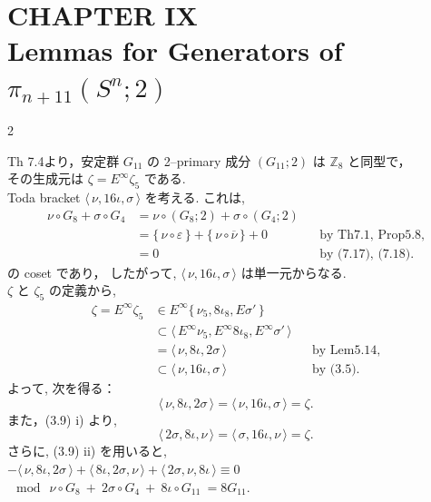 \documentclass[10pt, leqno]{ltjsarticle}
\author{}
\date{}
\newcommand{\toda}[1]{\{\,#1\,\}}              %
\newcommand{\todas}[1]{\langle\,#1\,\rangle}
\newcommand{\pis}[2]{\pi_{#1}(#2)}       %
\numberwithin{equation}{section}
\theoremstyle{plain}
\theoremstyle{definition}
\theoremstyle{remark}
\begin{document}
\setcounter{section}{9}


\section*{CHAPTER IX\\
Lemmas for Generators of \(\pis{n+11}{S^n;2}\)}

\begin{paracol}{2}

Th 7.4より，安定群 \(G_{11}\) の 2–primary 成分 \((G_{11};2)\) は 
\(\mathbb Z_8\) と同型で，\\
その生成元は \(\zeta=E^\infty\zeta_5\) である.\\
Toda bracket 
\(\todas{\nu,16\iota,\sigma}\)
を考える. これは,
\[
\begin{align*}
\nu\circ G_8+\sigma\circ G_4
& = \nu\circ (G_8;2)+\sigma\circ (G_4;2) \\
& = \{\,\nu\circ\varepsilon\,\}+\{\,\nu\circ\overline{\nu}\,\}+0 
&& \text{by Th7.1, Prop5.8,}\\
& = 0
&& \text{by (7.17), (7.18)}.
\end{align*}
\]
の coset であり，
したがって,  \(\todas{\nu,16\iota,\sigma}\) は単一元からなる. \\
\(\zeta\) と \(\zeta_5\) の定義から, 
\[
\begin{align*}
\zeta
= E^\infty\zeta_5
& \in E^\infty\toda{\nu_5,8\iota_8,E\sigma'}\\
& \subset \todas{E^\infty\nu_5, E^\infty8\iota_8, E^\infty\sigma'}\\
& = \todas{\nu,8\iota,2\sigma}
&& \text{by Lem5.14,}\\
& \subset \todas{\nu,16\iota,\sigma}
&& \text{by (3.5)}.  
\end{align*}
\]
よって, 次を得る：
\begin{equation}
\todas{\nu,8\iota,2\sigma} = \todas{\nu,16\iota,\sigma} = \zeta.
\end{equation}
また，(3.9) i) より, 
\begin{equation}
\todas{2\sigma,8\iota,\nu} = \todas{\sigma,16\iota,\nu} =  \zeta. 
\end{equation}
さらに,  (3.9) ii) を用いると, \\
\(
-\todas{\nu,8\iota,2\sigma}
+\todas{8\iota,2\sigma,\nu}
+\todas{2\sigma,\nu,8\iota}
\equiv 0
\)
\(\mod{\ \nu\circ G_8\ +\ 2\sigma\circ G_4\ +\ 8\iota\circ G_{11}\ } = 8G_{11}.\)\\

\end{paracol}
\end{document}
